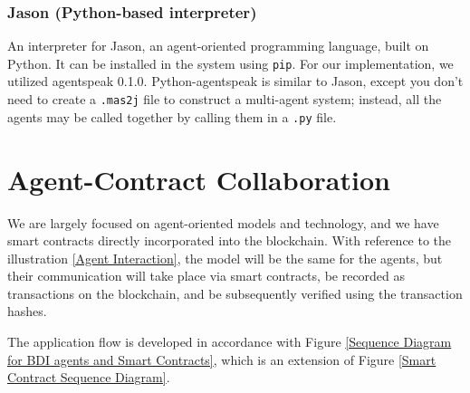 \subsubsection{Jason (Python-based interpreter)}

An interpreter for Jason, an agent-oriented programming language, built on Python. It can be installed in the system using \texttt{\ac{pip}}. For our implementation, we utilized agentspeak 0.1.0. Python-agentspeak is similar to Jason, except you don't need to create a \texttt{.mas2j} file to construct a multi-agent system; instead, all the agents may be called together by calling them in a \texttt{.py} file.


\section{Agent-Contract Collaboration}

 
 We are largely focused on agent-oriented models and technology, and we have smart contracts directly incorporated into the blockchain. With reference to the illustration \ref{Agent Interaction}, the model will be the same for the agents, but their communication will take place via smart contracts, be recorded as transactions on the blockchain, and be subsequently verified using the transaction hashes.

 \vspace{.5cm}
The application flow is developed in accordance with Figure \ref{Sequence Diagram for BDI agents and Smart Contracts}, which is an extension of Figure \ref{Smart Contract Sequence Diagram}.

